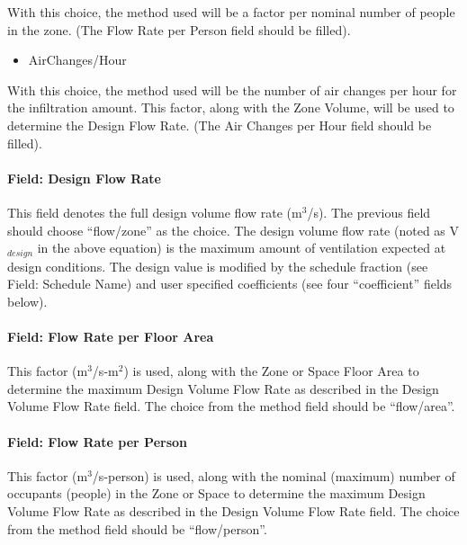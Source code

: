With this choice, the method used will be a factor per nominal number of people in the zone. (The Flow Rate per Person field should be filled).

\begin{itemize}
\tightlist
\item
  AirChanges/Hour
\end{itemize}

With this choice, the method used will be the number of air changes per hour for the infiltration amount. This factor, along with the Zone Volume, will be used to determine the Design Flow Rate. (The Air Changes per Hour field should be filled).

\paragraph{Field: Design Flow Rate}\label{field-design-flow-rate-1}

This field denotes the full design volume flow rate (m\(^{3}\)/s). The previous field should choose ``flow/zone'' as the choice. The design volume flow rate (noted as V\(_{design}\) in the above equation) is the maximum amount of ventilation expected at design conditions. The design value is modified by the schedule fraction (see Field: Schedule Name) and user specified coefficients (see four ``coefficient'' fields below).

\paragraph{Field: Flow Rate per Floor Area}\label{field-flow-rate-per-zone-floor-area}

This factor (m\(^{3}\)/s-m\(^{2}\)) is used, along with the Zone or Space Floor Area to determine the maximum Design Volume Flow Rate as described in the Design Volume Flow Rate field. The choice from the method field should be ``flow/area''.

\paragraph{Field: Flow Rate per Person}\label{field-flow-rate-per-person}

This factor (m\(^{3}\)/s-person) is used, along with the nominal (maximum) number of occupants (people) in the Zone or Space to determine the maximum Design Volume Flow Rate as described in the Design Volume Flow Rate field. The choice from the method field should be ``flow/person''.

